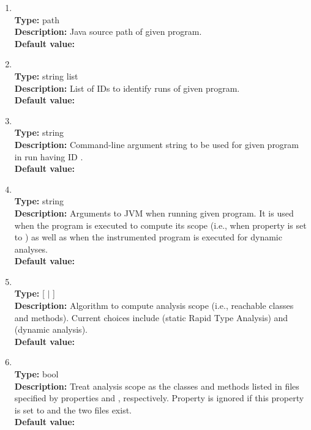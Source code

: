 \begin{enumerate}
\item
{} \\
{\bf Type:} path \\
{\bf Description:} Java source path of given program. \\
{\bf Default value:}  

\item
{} \\
{\bf Type:} string list \\
{\bf Description:} List of IDs to identify runs of given program. \\
{\bf Default value:}  

\item
{} \\
{\bf Type:} string \\
{\bf Description:} Command-line argument string to be used for given program in run having ID . \\
{\bf Default value:} 

\item
{} \\
{\bf Type:} string \\
{\bf Description:} Arguments to JVM when running given program.  It is used when the program is executed to compute its scope (i.e., when property  is set to ) as well as when the instrumented program is executed for dynamic analyses. \\
{\bf Default value:} 

\item
{} \\
{\bf Type:} [ $|$ ] \\
{\bf Description:} Algorithm to compute analysis scope (i.e., reachable classes and methods).  Current choices include  (static Rapid Type Analysis) and  (dynamic analysis). \\
{\bf Default value:} 

\item
{} \\
{\bf Type:} bool \\
{\bf Description:} Treat analysis scope as the classes and methods listed in files specified by properties  and , respectively. Property  is ignored if this property is set to  and the two files exist. \\
{\bf Default value:}  


\end{enumerate}
